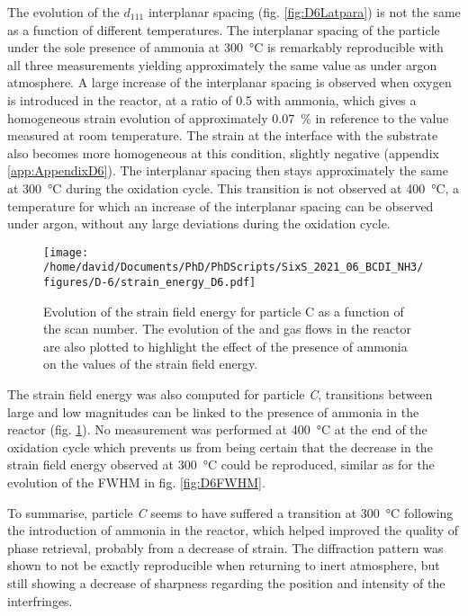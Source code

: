 The evolution of the $d_{111}$ interplanar spacing (fig. \ref{fig:D6Latpara}) is not the same as a function of different temperatures.
The interplanar spacing of the particle under the sole presence of ammonia at \qty{300}{\degreeCelsius} is remarkably reproducible with all three measurements yielding approximately the same value as under argon atmosphere.
A large increase of the interplanar spacing is observed when oxygen is introduced in the reactor, at a ratio of \num{0.5} with ammonia, which gives a homogeneous strain evolution of approximately \qty{0.07}{\percent} in reference to the value measured at room temperature.
The strain at the interface with the substrate also becomes more homogeneous at this condition, slightly negative (appendix \ref{app:AppendixD6}).
The interplanar spacing then stays approximately the same at \qty{300}{\degreeCelsius} during the oxidation cycle.
This transition is not observed at \qty{400}{\degreeCelsius}, a temperature for which an increase of the interplanar spacing can be observed under argon, without any large deviations during the oxidation cycle.

\begin{figure}[!htb]
    \centering
    \texttt{[image: /home/david/Documents/PhD/PhDScripts/SixS\_2021\_06\_BCDI\_NH3/figures/D-6/strain\_energy\_D6.pdf]}
    \caption{
        Evolution of the strain field energy for particle C as a function of the scan number.
        The evolution of the  and  gas flows in the reactor are also plotted to highlight the effect of the presence of ammonia on the values of the strain field energy.
    }
    \label{fig:D6SFE}
\end{figure}

The strain field energy was also computed for particle \textit{C}, transitions between large and low magnitudes can be linked to the presence of ammonia in the reactor (fig. \ref{fig:D6SFE}).
No measurement was performed at \qty{400}{\degreeCelsius} at the end of the oxidation cycle which prevents us from being certain that the decrease in the strain field energy observed at \qty{300}{\degreeCelsius} could be reproduced, similar as for the evolution of the FWHM in fig. \ref{fig:D6FWHM}.

To summarise, particle \textit{C} seems to have suffered a transition at \qty{300}{\degreeCelsius} following the introduction of ammonia in the reactor, which helped improved the quality of phase retrieval, probably from a decrease of strain.
The diffraction pattern was shown to not be exactly reproducible when returning to inert atmosphere, but still showing a decrease of sharpness regarding the position and intensity of the interfringes.

